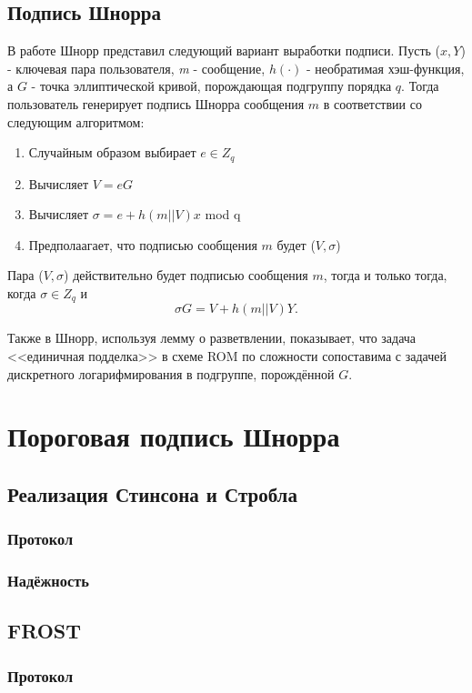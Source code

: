 \section{Подпись Шнорра}

В работе \cite{Schnorr} Шнорр представил следующий вариант выработки подписи. Пусть ($x, Y$) - ключевая пара пользователя, \textit{m} - сообщение, $h(\cdot)$ - необратимая хэш-функция, а $G$ - точка эллиптической кривой, порождающая подгруппу порядка $q$. Тогда пользователь генерирует подпись Шнорра сообщения $m$ в соответствии со следующим алгоритмом:

\begin{enumerate}
    \item Случайным образом выбирает $e \in Z_q$
    \item Вычисляет $V = eG$
    \item Вычисляет $\sigma = e + h(m||V)x$ mod q
    \item Предполаагает, что подписью сообщения $m$ будет ($V, \sigma$)
\end{enumerate}

Пара ($V, \sigma$) действительно будет подписью сообщения $m$, тогда и только тогда, когда $\sigma \in Z_q$ и $$ \sigma G = V + h(m||V)Y. $$

Также в \cite{Schnorr} Шнорр, используя лемму о разветвлении, показывает, что задача <<единичная подделка>> в схеме ROM по сложности сопоставима с задачей дискретного логарифмирования в подгруппе, порождённой $G$. 
  
\chapter{Пороговая подпись Шнорра}
\section{Реализация Стинсона и Стробла}
\subsection{Протокол}
\subsection{Надёжность}
\section{FROST}
\subsection{Протокол}
